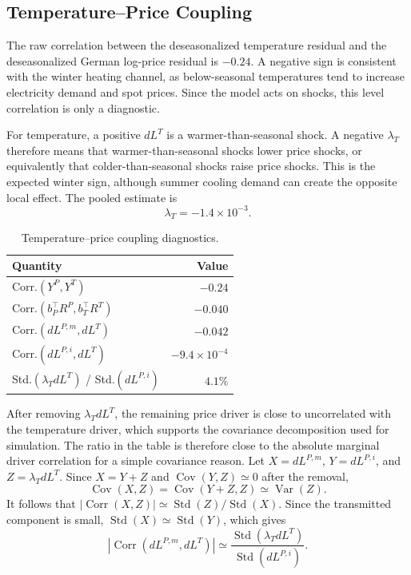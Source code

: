 \subsection{Temperature--Price Coupling}\label{ssec:temperature-price-coupling}

The raw correlation between the deseasonalized temperature residual and the
deseasonalized German log-price residual is \(-0.24\). A negative sign is
consistent with the winter heating channel, as below-seasonal temperatures tend
to increase electricity demand and spot prices. Since the model acts on shocks,
this level correlation is only a diagnostic.

For temperature, a positive \(dL^T\) is a warmer-than-seasonal shock. A negative
\(\lambda_T\) therefore means that warmer-than-seasonal shocks lower price
shocks, or equivalently that colder-than-seasonal shocks raise price shocks.
This is the expected winter sign, although summer cooling demand can create the
opposite local effect. The pooled estimate is
\[
  \lambda_T = -1.4\times 10^{-3}.
\]

\begin{table}[H]
  \centering
  \caption{Temperature--price coupling diagnostics.}
  \label{tab:temperature-price-coupling-diagnostics}
  \begin{tabular}{@{}lr@{}}
    \toprule
    Quantity & Value \\
    \midrule
    Corr.\((Y^P,Y^T)\) & \(-0.24\) \\
    Corr.\((b_P^\top R^P,b_T^\top R^T)\) & \(-0.040\) \\
    Corr.\((dL^{P,m},dL^T)\) & \(-0.042\) \\
    Corr.\((dL^{P,i},dL^T)\) & \(-9.4{\times}10^{-4}\) \\
    Std.\((\lambda_T dL^T)\) / Std.\((dL^{P,i})\) & \(4.1\%\) \\
    \bottomrule
  \end{tabular}
\end{table}

After removing \(\lambda_T dL^T\), the remaining price driver is close
to uncorrelated with the temperature driver, which supports the covariance
decomposition used for simulation. The ratio in the table is therefore close to
the absolute marginal driver correlation for a simple covariance reason. Let
\(X=dL^{P,m}\), \(Y=dL^{P,i}\), and \(Z=\lambda_T dL^T\). Since \(X=Y+Z\) and
\(\operatorname{Cov}(Y,Z)\simeq 0\) after the removal,
\[
  \operatorname{Cov}(X,Z)
  =
  \operatorname{Cov}(Y+Z,Z)
  \simeq
  \operatorname{Var}(Z).
\]
It follows that \(|\operatorname{Corr}(X,Z)|\simeq \operatorname{Std}(Z)/
\operatorname{Std}(X)\). Since the transmitted component is small,
\(\operatorname{Std}(X)\simeq \operatorname{Std}(Y)\), which gives
\[
  |\operatorname{Corr}(dL^{P,m},dL^T)|
  \simeq
  \frac{\operatorname{Std}(\lambda_T dL^T)}
       {\operatorname{Std}(dL^{P,i})}.
\]

